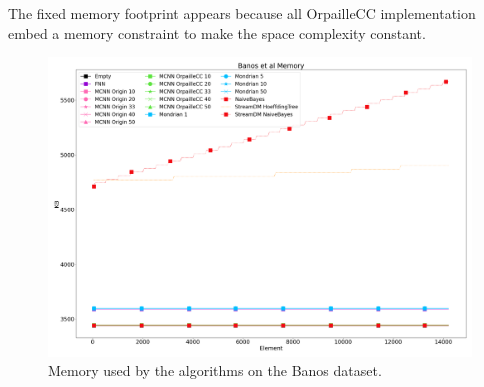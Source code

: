 The fixed memory footprint appears because all OrpailleCC implementation embed
a memory constraint to make the space complexity constant.

\begin{figure}[H]
	\includegraphics[width=\linewidth]{figures/results/banos_memory.png}
	\caption{Memory used by the algorithms on the Banos dataset.}
\end{figure}


